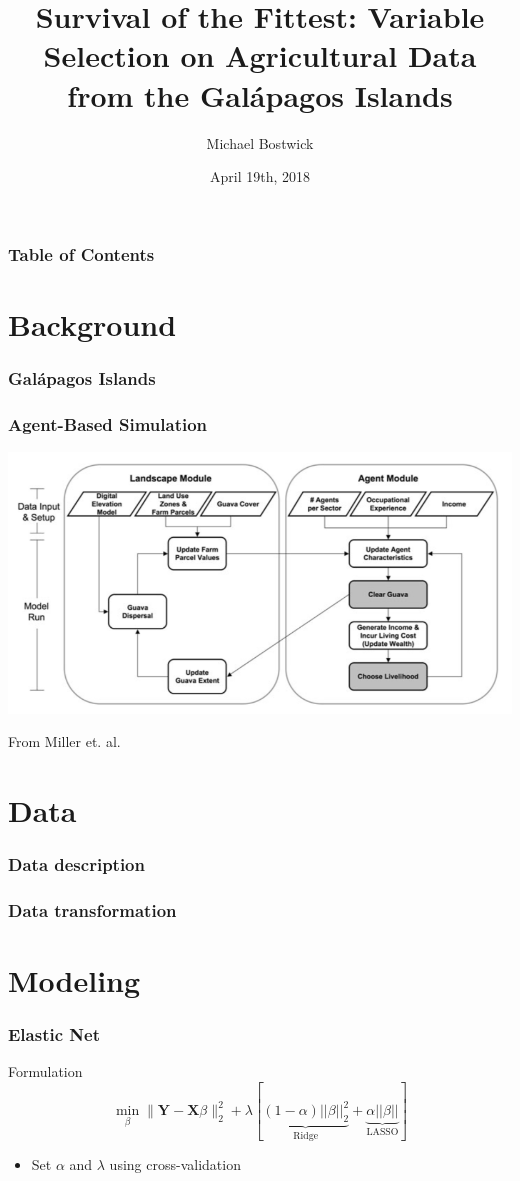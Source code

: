 \documentclass{beamer}
\title[Survival of the Fittest]
{Survival of the Fittest: Variable Selection on Agricultural Data from the Gal\'apagos Islands}
\author
{Michael Bostwick}
\date
{April 19th, 2018}
\newcommand{\bX}{\mathbf{X}}
\newcommand{\bY}{\mathbf{Y}}
\begin{document}
 
\frame{\titlepage}

\begin{frame}
\frametitle{Table of Contents}
\tableofcontents
\end{frame}
 
\section{Background}

\begin{frame}
\frametitle{Gal\'apagos Islands}
\end{frame}

\begin{frame}
\frametitle{Agent-Based Simulation}
\includegraphics[scale=0.3]{abm_chart}

From Miller et. al.

\end{frame}

\section{Data}

\begin{frame}
\frametitle{Data description}
\end{frame}

\begin{frame}
\frametitle{Data transformation}
\end{frame}

\section{Modeling}

\begin{frame}
\frametitle{Elastic Net}

\begin{block}{Formulation}
	\[\min_{\beta}  \|\bY - \bX\beta\|_{2}^{2} + \lambda[ \underbrace{(1 - \alpha)||\beta||_2^2}_\text{Ridge} + \underbrace{\alpha||\beta||}_\text{LASSO}]\]
\end{block}

\begin{itemize}
	\item{Set $\alpha$ and $\lambda$ using cross-validation}
\end{itemize} 

\end{frame}
\end{document}
